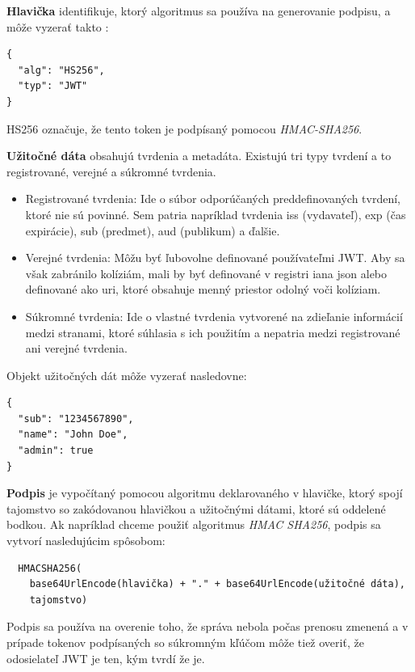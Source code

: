 \vskip 0.5cm
\textbf{Hlavička} identifikuje, ktorý algoritmus sa používa na generovanie podpisu, a môže
vyzerať takto \cite{rfc7519}:


\begin{lstlisting}
{
  "alg": "HS256",
  "typ": "JWT"
}
\end{lstlisting}
HS256 označuje, že tento token je podpísaný pomocou \textit{HMAC-SHA256}.

\vskip 0.5cm
\textbf{Užitočné dáta} obsahujú tvrdenia a metadáta. Existujú tri typy tvrdení a to
registrované, verejné a súkromné tvrdenia.

\begin{itemize}
\item Registrované tvrdenia: Ide o súbor odporúčaných preddefinovaných tvrdení, ktoré nie sú povinné.
Sem patria napríklad tvrdenia iss (vydavateľ), exp (čas expirácie), sub (predmet), aud (publikum) a ďalšie.
\item Verejné tvrdenia: Môžu byť ľubovolne definované používateľmi JWT. Aby sa však zabránilo kolíziám,
mali by byť definované v registri \acrshort{iana} \acrshort{json} alebo definované ako \acrshort{uri},
ktoré obsahuje menný priestor odolný voči kolíziam.
\item Súkromné tvrdenia: Ide o vlastné tvrdenia vytvorené na zdieľanie informácií medzi stranami,
ktoré súhlasia s ich použitím a nepatria medzi registrované ani verejné tvrdenia.
\end{itemize}

Objekt užitočných dát môže vyzerať nasledovne:
\begin{lstlisting}
{
  "sub": "1234567890",
  "name": "John Doe",
  "admin": true
}
\end{lstlisting}

\vskip 0.5cm
\textbf{Podpis} je vypočítaný pomocou algoritmu deklarovaného v hlavičke, ktorý spojí tajomstvo
so zakódovanou hlavičkou a užitočnými dátami, ktoré sú oddelené bodkou.
Ak napríklad chceme použiť algoritmus \textit{HMAC SHA256}, podpis sa vytvorí nasledujúcim spôsobom:

  \begin{verbatim}
  HMACSHA256(
    base64UrlEncode(hlavička) + "." + base64UrlEncode(užitočné dáta),
    tajomstvo)
  \end{verbatim}

Podpis sa používa na overenie toho, že správa nebola počas prenosu zmenená a v prípade tokenov
podpísaných so súkromným kľúčom môže tiež overiť, že odosielateľ JWT je ten, kým tvrdí že je.

